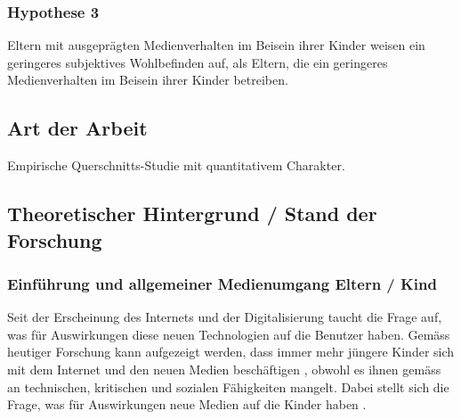 \subsubsection{Hypothese 3}
Eltern mit ausgeprägten Medienverhalten im Beisein ihrer Kinder weisen ein geringeres subjektives Wohlbefinden auf, als Eltern, die ein geringeres Medienverhalten im Beisein ihrer Kinder betreiben.
\subsection{Art der Arbeit}
Empirische Querschnitts-Studie mit quantitativem Charakter.
\subsection{Theoretischer Hintergrund / Stand der Forschung}
\subsubsection{Einführung und allgemeiner Medienumgang Eltern / Kind}
Seit der Erscheinung des Internets und der Digitalisierung taucht die Frage auf, was für Auswirkungen diese neuen Technologien auf die Benutzer haben. Gemäss heutiger Forschung kann aufgezeigt werden, dass immer mehr jüngere Kinder sich mit dem Internet und den neuen Medien beschäftigen \cite{Rideout2013, Chaudron2015}, obwohl es ihnen gemäss  an technischen, kritischen und sozialen Fähigkeiten mangelt. Dabei stellt sich die Frage, was für Auswirkungen neue Medien auf die Kinder haben \cite{Tomopoulos2010, Pempek2014, Livingstone2015, Masur2015, Troseth2016}. 

